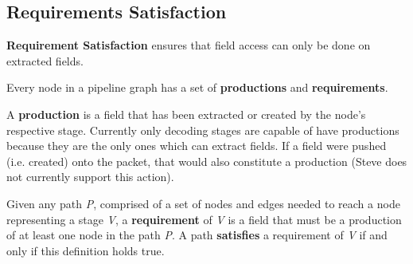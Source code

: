%
%

\subsection{Requirements Satisfaction} \label{guide:requirements}

\textbf{Requirement Satisfaction} ensures that field access can only be done on extracted fields.

Every node in a pipeline graph has a set of \textbf{productions} and \textbf{requirements}.

A \textbf{production} is a field that has been extracted or created by the node's respective stage. Currently only decoding stages are capable of have productions because they are the only ones which can extract fields. If a field were pushed (i.e. created) onto the packet, that would also constitute a production (Steve does not currently support this action).

Given any path \textit{P}, comprised of a set of nodes and edges needed to reach a node representing a stage \textit{V}, a \textbf{requirement} of \textit{V} is a field that must be a production of at least one node in the path \textit{P}. A path \textbf{satisfies} a requirement of \textit{V} if and only if this definition holds true.

